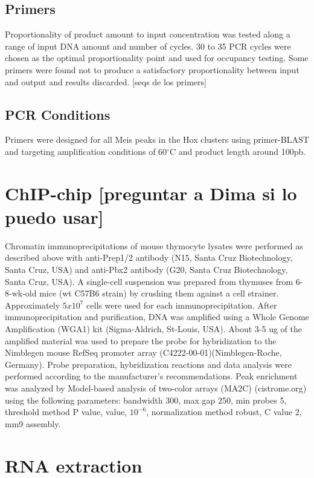 \subsection{Primers}

Proportionality of product amount to input concentration was tested along a range of input DNA amount and number of cycles. 30 to 35 PCR cycles were chosen as the optimal proportionality point and used for occupancy testing. Some primers were found not to produce a satisfactory proportionality between input and output and results discarded. [seqs de los primers]

\subsection{PCR Conditions}

Primers were designed for all Meis peaks in the Hox clusters using primer-BLAST and targeting amplification conditions of 60$^\circ$C and product length around 100pb. 

\section{ChIP-chip [preguntar a Dima si lo puedo usar]}

Chromatin immunoprecipitations of mouse thymocyte lysates were performed as described above with anti-Prep1/2 antibody (N15, Santa Cruz Biotechnology, Santa Cruz, USA) and anti-Pbx2 antibody (G20, Santa Cruz Biotechnology, Santa Cruz, USA). A single-cell suspension was prepared from thymuses from 6-8-wk-old mice (wt C57B6 strain) by crushing them against a cell strainer. Approximately $5x10^7$ cells were used for each immunoprecipitation. After immunoprecipitation and purification, DNA was amplified using a Whole Genome Amplification (WGA1) kit (Sigma-Aldrich, St-Louis, USA). About 3-5 ug of the amplified material was used to prepare the probe for hybridization to the Nimblegen mouse RefSeq promoter array (C4222-00-01)(Nimblegen-Roche, Germany). Probe preparation, hybridization reactions and data analysis were performed according to the manufacturer’s recommendations. Peak enrichment was analyzed by Model-based analysis of two-color arrays (MA2C) (cistrome.org) using the following parameters: bandwidth 300, max gap 250, min probes 5, threshold method P value, value, $10^{-6}$, normalization method robust, C value 2, mm9 assembly.

\section{RNA extraction}


